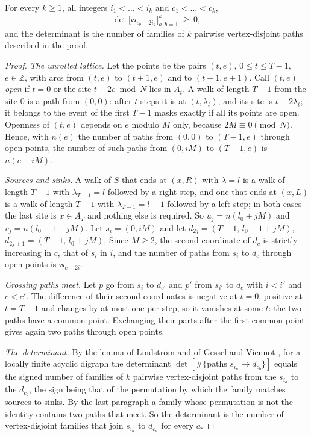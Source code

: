 \begin{theorem}\label{thm:tp}
For every $k\ge1$, all integers $i_1<\dots<i_k$ and $c_1<\dots<c_k$,
\[
\det\bigl[\mathsf{w}_{c_b-2i_a}\bigr]_{a,b=1}^{k}\ \ge\ 0,
\]
and the determinant is the number of families of $k$ pairwise vertex-disjoint paths described in the proof.
\end{theorem}
\begin{proof}
\emph{The unrolled lattice.} Let the points be the pairs $(t,e)$, $0\le t\le T-1$, $e\in\mathbb{Z}$, with arcs from $(t,e)$ to $(t+1,e)$ and to $(t+1,e+1)$. Call $(t,e)$ \emph{open} if $t=0$ or the site $t-2e \bmod N$ lies in $A_t$. A walk of length $T-1$ from the site $0$ is a path from $(0,0)$: after $t$ steps it is at $(t,\lambda_t)$, and its site is $t-2\lambda_t$; it belongs to the event of the first $T-1$ masks exactly if all its points are open. Openness of $(t,e)$ depends on $e$ modulo $M$ only, because $2M\equiv0\pmod N$. Hence, with $n(e)$ the number of paths from $(0,0)$ to $(T-1,e)$ through open points, the number of such paths from $(0,iM)$ to $(T-1,e)$ is $n(e-iM)$.

\emph{Sources and sinks.} A walk of $S$ that ends at $(x,R)$ with $\lambda=l$ is a walk of length $T-1$ with $\lambda_{T-1}=l$ followed by a right step, and one that ends at $(x,L)$ is a walk of length $T-1$ with $\lambda_{T-1}=l-1$ followed by a left step; in both cases the last site is $x\in A_T$ and nothing else is required. So $u_j=n(l_0+jM)$ and $v_j=n(l_0-1+jM)$. Let $s_i=(0,iM)$ and let $d_{2j}=(T-1,\,l_0-1+jM)$, $d_{2j+1}=(T-1,\,l_0+jM)$. Since $M\ge2$, the second coordinate of $d_c$ is strictly increasing in $c$, that of $s_i$ in $i$, and the number of paths from $s_i$ to $d_c$ through open points is $\mathsf{w}_{c-2i}$.

\emph{Crossing paths meet.} Let $p$ go from $s_i$ to $d_{c'}$ and $p'$ from $s_{i'}$ to $d_c$ with $i<i'$ and $c<c'$. The difference of their second coordinates is negative at $t=0$, positive at $t=T-1$ and changes by at most one per step, so it vanishes at some $t$: the two paths have a common point. Exchanging their parts after the first common point gives again two paths through open points.

\emph{The determinant.} By the lemma of Lindstr\"om and of Gessel and Viennot \cite{lgv}, for a locally finite acyclic digraph the determinant $\det[\#\{\text{paths }s_{i_a}\to d_{c_b}\}]$ equals the signed number of families of $k$ pairwise vertex-disjoint paths from the $s_{i_a}$ to the $d_{c_b}$, the sign being that of the permutation by which the family matches sources to sinks. By the last paragraph a family whose permutation is not the identity contains two paths that meet. So the determinant is the number of vertex-disjoint families that join $s_{i_a}$ to $d_{c_a}$ for every $a$.
\end{proof}

